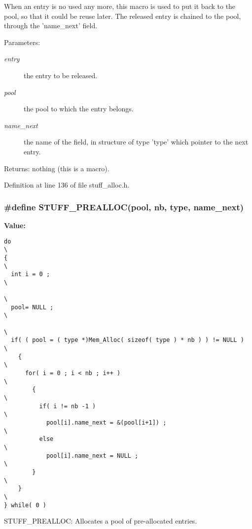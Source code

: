 When an entry is no used any more, this macro is used to put it back to the pool, so that it could be reuse later. The released entry is chained to the pool, through the 'name\_\-next' field.

\begin{Desc}
\item[Parameters:]
\begin{description}
\item[{\em entry}]the entry to be released. \item[{\em pool}]the pool to which the entry belongs. \item[{\em name\_\-next}]the name of the field, in structure of type 'type' which pointer to the next entry.\end{description}
\end{Desc}
\begin{Desc}
\item[Returns:]nothing (this is a macro). \end{Desc}


Definition at line 136 of file stuff\_\-alloc.h.
\subsubsection{\setlength{\rightskip}{0pt plus 5cm}\#define STUFF\_\-PREALLOC(pool, nb, type, name\_\-next)}\label{stuff__alloc_8h_a1}


{\bf Value:}

\footnotesize\begin{verbatim}do                                                                        \
{                                                                         \
  int i = 0 ;                                                             \
                                                                          \
  pool= NULL ;                                                            \
                                                                          \
  if( ( pool = ( type *)Mem_Alloc( sizeof( type ) * nb ) ) != NULL )         \
    {                                                                     \
      for( i = 0 ; i < nb ; i++ )                                         \
        {                                                                 \
          if( i != nb -1 )                                                \
            pool[i].name_next = &(pool[i+1]) ;                            \
          else                                                            \
            pool[i].name_next = NULL ;                                    \
        }                                                                 \
    }                                                                     \
} while( 0 )
\end{verbatim}\normalsize 
STUFF\_\-PREALLOC: Allocates a pool of pre-allocated entries.


